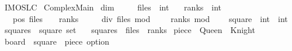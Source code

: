 %
\begin{isabellebody}%
%
%
\isadelimdocument
%
\endisadelimdocument
%
\isatagdocument
%
\isamarkuptrue%
%
\endisatagdocument
{\isafolddocument}%
%
\isadelimdocument
%
\endisadelimdocument
%
\isadelimtheory
%
\endisadelimtheory
%
\isatagtheory
{}\isamarkupfalse%
\ IMO{\isacharunderscore}{}{}{}{}{\isacharunderscore}SL{\isacharunderscore}C{}\isanewline
{}\ Complex{\isacharunderscore}Main\isanewline
{}%
\endisatagtheory
{\isafoldtheory}%
%
\isadelimtheory
\isanewline
%
\endisadelimtheory
\isanewline
{}\isamarkupfalse%
\ dim\ {\isacharequal}\ \isanewline
\ \ \ files\ {\isacharcolon}{\isacharcolon}\ int\isanewline
\ \ \ ranks\ {\isacharcolon}{\isacharcolon}\ int\isanewline
\ \ \ pos{\isacharcolon}\ {\isachardoublequoteopen}files\ {\isachargreater}\ {}\ {\isasymand}\ ranks\ {\isachargreater}\ {}{\isachardoublequoteclose}\isanewline
\ \ \ div{}{\isacharcolon}\ {\isachardoublequoteopen}files\ mod\ {}\ {\isacharequal}\ {}\ {\isasymand}\ ranks\ mod\ {}\ {\isacharequal}\ {}{\isachardoublequoteclose}\isanewline
{}\isanewline
\isanewline
{}\isamarkupfalse%
\ square\ {\isacharequal}\ {\isachardoublequoteopen}int\ {\isasymtimes}\ int{\isachardoublequoteclose}\isanewline
\isanewline
{}\isamarkupfalse%
\ squares\ {\isacharcolon}{\isacharcolon}\ {\isachardoublequoteopen}square\ set{\isachardoublequoteclose}\ \isanewline
\ \ {\isachardoublequoteopen}squares\ {\isacharequal}\ {\isacharbraceleft}{}{\isachardot}{\isachardot}{\isacharless}files{\isacharbraceright}\ {\isasymtimes}\ {\isacharbraceleft}{}{\isachardot}{\isachardot}{\isacharless}ranks{\isacharbraceright}{\isachardoublequoteclose}\isanewline
\isanewline
{}\isamarkupfalse%
\ piece\ {\isacharequal}\ Queen\ {\isacharbar}\ Knight\isanewline
\isanewline
{}\isamarkupfalse%
\ board\ {\isacharequal}\ {\isachardoublequoteopen}square\ {\isasymRightarrow}\ piece\ option{\isachardoublequoteclose}\isanewline
\isanewline
{}\isamarkupfalse%

\end{isabellebody}
